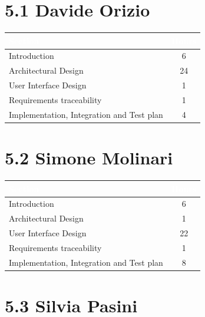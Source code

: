 \section*{5.1 \quad Davide Orizio}
\renewcommand{\arraystretch}{1.2} %

\begin{table}[h!]
    \centering
    \begin{tabular}{|l|c|}
        \hline
        \rowcolor[HTML]{5C8A99}
        \textbf{\textcolor{white}{Section}} & \textbf{\textcolor{white}{Hours}} \\ \hline
        Introduction                       & 6     \\ \hline
        Architectural Design               & 24     \\ \hline
        User Interface Design              & 1    \\ \hline
        Requirements traceability          & 1     \\ \hline
        Implementation, Integration and Test plan & 4     \\ \hline
    \end{tabular}
\end{table}

\section*{5.2 \quad Simone Molinari}
\renewcommand{\arraystretch}{1.2} %

\begin{table}[h!]
    \centering
    \begin{tabular}{|l|c|}
        \hline
        \rowcolor[HTML]{5C8A99}
        \textbf{\textcolor{white}{Section}} & \textbf{\textcolor{white}{Hours}} \\ \hline
        Introduction                        & 6     \\ \hline
        Architectural Design                & 1     \\ \hline
        User Interface Design               & 22    \\ \hline
        Requirements traceability           & 1     \\ \hline
        Implementation, Integration and Test plan & 8     \\ \hline
    \end{tabular}
\end{table}

\section*{5.3 \quad Silvia Pasini}
\renewcommand{\arraystretch}{1.2} %

